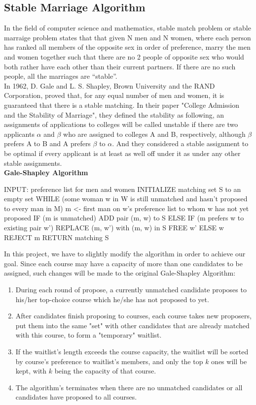 \documentclass[twoside,twocolumn]{article}
\begin{document}
    \subsection{Stable Marriage Algorithm}
    In the field of computer science and mathematics, stable match problem or stable marraige problem states that that given N men and N women, 
    where each person has ranked all members of the opposite sex in order of preference, marry the men and women together such that there are no 
    2 people of opposite sex who would both rather have each other than their current partners. If there are no such people, all the marriages are “stable”.
    \\ In 1962, D. Gale and L. S. Shapley, Brown University and the RAND Corporation, proved that, for any equal number of men and women, it is guaranteed
    that there is a stable matching. In their paper "College Admission and the Stability of Marriage", they defined the stability as following, an assignments
    of applications to colleges will be called unstable if there are two applicants $\alpha$ and $\beta$ who are assigned to colleges A and B, respectively,
    although $\beta$ prefers A to B and A prefers $\beta$ to $\alpha$. And they considered a stable assignment to be optimal if every applicant is at least 
    as well off under it as under any other stable assignments.
    \\ \textbf{Gale-Shapley Algorithm}
\begin{spverbatim}
INPUT: preference list for men and women
INITIALIZE matching set S to an empty set
WHILE (some woman w in W is still unmatched and hasn't proposed to every man in M)
    m <- first man on w's preference list to whom w has not yet proposed
    IF (m is unmatched)
        ADD pair (m, w) to S
    ELSE IF (m prefers w to existing pair w')
        REPLACE (m, w') with (m, w) in S
        FREE w'
    ELSE 
        w REJECT m
RETURN matching S
\end{spverbatim}
    In this project, we have to slightly modify the algorithm in order to achieve our goal. Since each course may have a capacity
    of more than one candidates to be assigned, such changes will be made to the original Gale-Shapley Algorithm:
    \begin{enumerate}
        \item During each round of propose, a currently unmatched candidate proposes to his/her top-choice course which he/she 
        has not proposed to yet.
        \item After candidates finish proposing to courses, each course takes new proposers, put them into the same "set" with
        other candidates that are already matched with this course, to form a "temporary" waitlist.
        \item If the waitlist's length exceeds the course capacity, the waitlist will be sorted by course's preference to waitlist's
        members, and only the top $k$ ones will be kept, with $k$ being the capacity of that course.
        \item The algorithm's terminates when there are no unmatched candidates or all candidates have proposed to all courses.
    \end{enumerate}
\end{document}
